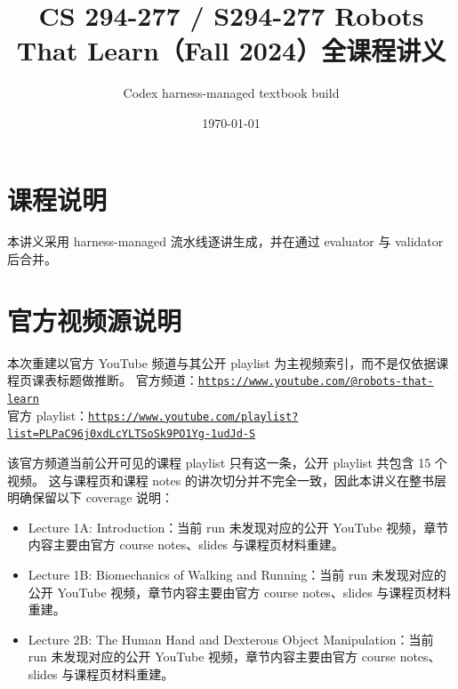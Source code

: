 \documentclass[a4paper]{article}
\title{CS 294-277 / S294-277 Robots That Learn（Fall 2024）全课程讲义}
\author{Codex harness-managed textbook build}
\date{\today}
\begin{document}
\maketitle
\tableofcontents
\newpage
\section*{课程说明}
本讲义采用 harness-managed 流水线逐讲生成，并在通过 evaluator 与 validator 后合并。
\section*{官方视频源说明}
本次重建以官方 YouTube 频道与其公开 playlist 为主视频索引，而不是仅依据课程页课表标题做推断。
官方频道：\href{https://www.youtube.com/@robots-that-learn}{\nolinkurl{https://www.youtube.com/@robots-that-learn}}\\
官方 playlist：\href{https://www.youtube.com/playlist?list=PLPaC96j0xdLcYLTSoSk9PO1Yg-1udJd-S}{\nolinkurl{https://www.youtube.com/playlist?list=PLPaC96j0xdLcYLTSoSk9PO1Yg-1udJd-S}}

该官方频道当前公开可见的课程 playlist 只有这一条，公开 playlist 共包含 15 个视频。
这与课程页和课程 notes 的讲次切分并不完全一致，因此本讲义在整书层明确保留以下 coverage 说明：
\begin{itemize}[leftmargin=2em]
\item Lecture 1A: Introduction：当前 run 未发现对应的公开 YouTube 视频，章节内容主要由官方 course notes、slides 与课程页材料重建。
\item Lecture 1B: Biomechanics of Walking and Running：当前 run 未发现对应的公开 YouTube 视频，章节内容主要由官方 course notes、slides 与课程页材料重建。
\item Lecture 2B: The Human Hand and Dexterous Object Manipulation：当前 run 未发现对应的公开 YouTube 视频，章节内容主要由官方 course notes、slides 与课程页材料重建。
\end{itemize}
\end{document}
